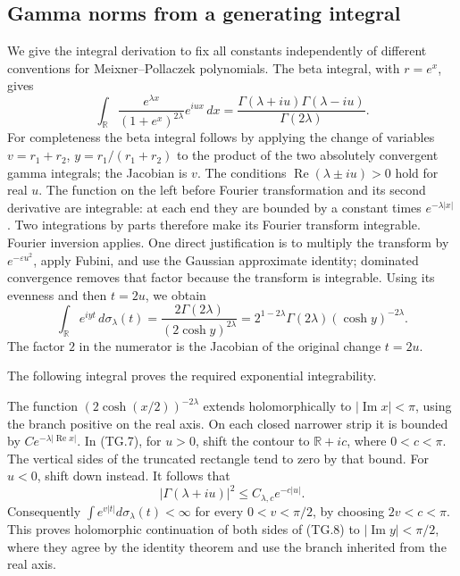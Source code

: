 \documentclass[11pt,a4paper]{article}
\begin{document}

\subsection{Gamma norms from a generating integral}

We give the integral derivation to fix all constants independently of
different conventions for Meixner--Pollaczek polynomials.  The beta
integral, with \(r=e^x\), gives
\[
 \int_{\mathbb R}\frac{e^{\lambda x}}{(1+e^x)^{2\lambda}}
                     e^{iux}\,dx
       =\frac{\Gamma(\lambda+iu)\Gamma(\lambda-iu)}
                    {\Gamma(2\lambda)}.
                                                               \tag{TG.7}
\]
For completeness the beta integral follows by applying the change of
variables \(v=r_1+r_2\), \(y=r_1/(r_1+r_2)\) to the product of
the two absolutely convergent gamma integrals; the Jacobian is \(v\).
The conditions \(\operatorname{Re}(\lambda\pm iu)>0\) hold for
real \(u\).  The function on the left before Fourier transformation
and its second derivative are integrable: at each end they are
bounded by a constant times \(e^{-\lambda|x|}\).
Two integrations by parts therefore make its Fourier transform
integrable.  Fourier inversion applies.  One direct justification is
to multiply the transform by \(e^{-\varepsilon u^2}\), apply
Fubini, and use the Gaussian approximate identity; dominated
convergence removes that factor because the transform is integrable.
Using its evenness and then \(t=2u\), we obtain
\[
 \int_{\mathbb R}e^{iyt}\,d\sigma_\lambda(t)
   =\frac{2\Gamma(2\lambda)}{(2\cosh y)^{2\lambda}}
   =2^{1-2\lambda}\Gamma(2\lambda)(\cosh y)^{-2\lambda}.
                                                               \tag{TG.8}
\]
The factor \(2\) in the numerator is the Jacobian of the original
change \(t=2u\).

The following integral proves the required exponential integrability.

The function \((2\cosh(x/2))^{-2\lambda}\) extends holomorphically
to \(|\operatorname{Im}x|<\pi\), using the branch positive on
the real axis.  On each closed narrower strip it is bounded by
\(C e^{-\lambda|\operatorname{Re}x|}\).  In (TG.7), for
\(u>0\), shift the contour to \(\mathbb R+ic\), where
\(0<c<\pi\).  The vertical sides of the truncated rectangle
tend to zero by that bound.  For \(u<0\), shift down instead.
It follows that
\[
 |\Gamma(\lambda+iu)|^2\leq C_{\lambda,c}e^{-c|u|}.
\]
Consequently \(\int e^{v|t|}d\sigma_\lambda(t)<\infty\) for
every \(0<v<\pi/2\), by choosing \(2v<c<\pi\).
This proves holomorphic continuation of both sides of (TG.8) to
\(|\operatorname{Im}y|<\pi/2\), where they agree by the identity
theorem and use the branch inherited from the real axis.
\end{document}

